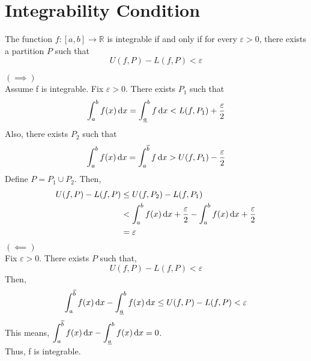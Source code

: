 \documentclass[12pt]{article}
\begin{document}
\section{Integrability Condition}
\begin{theo}{}
The function \(f:[a, b] \to \mathbb R\) is integrable if and only if for every \(\varepsilon > 0\), there exists a partition \(P\) such that \[U(f, P) - L(f, P) < \varepsilon\]
\end{theo}
\begin{prf}{}
\(\left(\implies\right)\)\\
Assume f is integrable. Fix \(\varepsilon > 0\). There exists \(P_1\) such that \[\displaystyle\int_a^b f(x)\,\mathrm{d} x = \displaystyle\int_{\underline{a}}^bf\,\mathrm{d} x < L(f, P_1) + \frac{\varepsilon}{2}\]
Also, there exists \(P_2\) such that 
\[\displaystyle\int_a^b f(x)\,\mathrm{d} x = \displaystyle\int_{a}^{\overline{b}}f\,\mathrm{d} x > U(f, P_1) - \frac{\varepsilon}{2}\]
Define \(P = P_1 \cup P_2\). Then,
\begin{align*}
    U(f, P) - L(f, P) &\le U(f, P_2) - L(f, P_1)\\
    &< \displaystyle\int_a^b f(x) \,\mathrm{d} x + \frac{\varepsilon}{2} - \displaystyle\int_a^b f(x)\,\mathrm{d} x + \frac{\varepsilon}{2}\\
    &= \varepsilon
\end{align*}
\(\left(\impliedby\right)\)\\
Fix \(\varepsilon > 0\). There exists \(P\) such that,
\[U(f, P) - L(f, P) < \varepsilon\]
Then, \[\displaystyle\int_a^{\overline{b}}f(x)\,\mathrm{d} x - \displaystyle\int_{\underline{a}}^bf(x)\,\mathrm{d} x \le U(f, P) - L(f, P) <  \varepsilon\]
This means, \(\displaystyle\int_a^{\overline{b}}f(x)\,\mathrm{d} x - \displaystyle\int_{\underline{a}}^bf(x)\,\mathrm{d} x = 0\).\\
Thus, f is integrable.
\end{prf}
\end{document}
